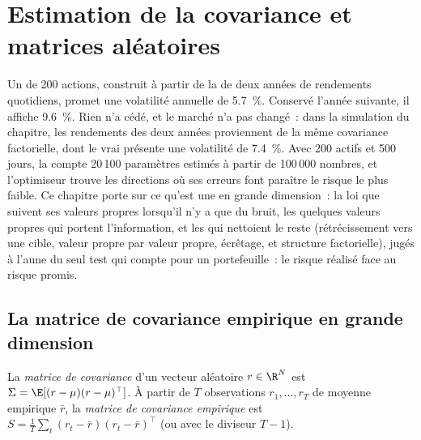 \chapter{Estimation de la covariance et matrices aléatoires}\label{ch:qm:covariance-estimation-and-random-matrices}

Un  de 200 actions, construit à partir de la  de deux années de rendements quotidiens, promet une volatilité annuelle de
5.7~\%. Conservé l'année suivante, il affiche 9.6~\%. Rien n'a cédé, et le marché n'a pas changé~: dans la simulation du chapitre, les rendements des deux années
proviennent de la même covariance factorielle, dont le vrai  présente une volatilité de 7.4~\%. Avec 200 actifs et 500 jours, la
 compte 20\,100 paramètres estimés à partir de 100\,000 nombres, et l'optimiseur trouve les directions où ses erreurs font paraître le risque
le plus faible. Ce chapitre porte sur ce qu'est une  en grande dimension~: la loi que suivent ses valeurs propres lorsqu'il n'y a que du bruit,
les quelques valeurs propres qui portent l'information, et les  qui nettoient le reste (rétrécissement vers une cible, valeur propre par valeur propre, écrêtage,
et structure factorielle), jugés à l'aune du seul test qui compte pour un portefeuille~: le risque réalisé face au risque promis.

\section{La matrice de covariance empirique en grande dimension}

\begin{definition}\label{def:qm:covariance-estimation-and-random-matrices:cov}
La \emph{matrice de covariance} d'un vecteur aléatoire $r \in \R^N$ est $\Sigma = \E[(r - \mu)(r - \mu)^\top]$. À partir de $T$ observations $r_1, \dots, r_T$
de moyenne empirique $\bar r$, la \emph{matrice de covariance empirique} est $S = \frac1T\sum_t(r_t - \bar r)(r_t - \bar r)^\top$ (ou avec le diviseur
$T - 1$).
\end{definition}

